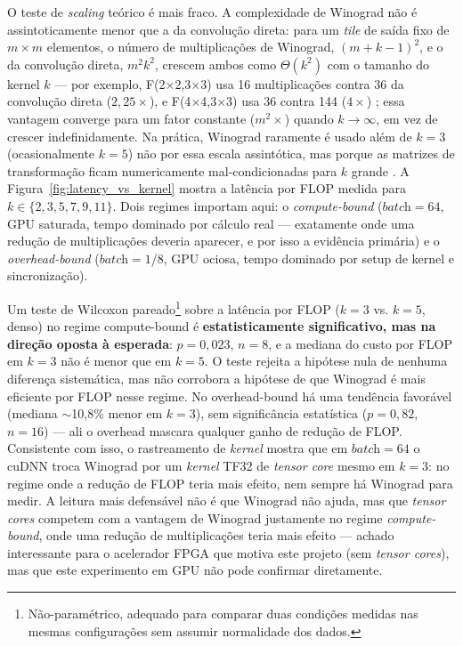\documentclass[conference]{IEEEtran}
\begin{document}
O teste de \textit{scaling} teórico é mais fraco. A complexidade de Winograd não é
assintoticamente menor que a da convolução direta: para um \textit{tile} de saída fixo de $m\times
m$ elementos, o número de multiplicações de Winograd, $(m+k-1)^2$, e o da convolução direta,
$m^2k^2$, crescem ambos como $\Theta(k^2)$ com o tamanho do kernel $k$ \cite{lavin2016fast} — por
exemplo, F(2$\times$2,3$\times$3) usa 16 multiplicações contra 36 da convolução direta
($2,25\times$), e F(4$\times$4,3$\times$3) usa 36 contra 144 ($4\times$) \cite{lavin2016fast}; essa
vantagem converge para um fator constante ($m^2\times$) quando $k\to\infty$, em vez de crescer
indefinidamente. Na prática, Winograd raramente é usado além de $k=3$ (ocasionalmente $k=5$) não
por essa escala assintótica, mas porque as matrizes de transformação ficam numericamente
mal-condicionadas para $k$ grande \cite{barabasz2020error}. A Figura~\ref{fig:latency_vs_kernel}
mostra a latência por FLOP medida para $k \in \{2,3,5,7,9,11\}$. Dois regimes importam aqui: o
\emph{compute-bound} ($\textit{batch}=64$, GPU saturada, tempo dominado por cálculo real —
exatamente onde uma redução de multiplicações deveria aparecer, e por isso a evidência primária) e o
\textit{overhead-bound} ($\textit{batch}=1$/$8$, GPU ociosa, tempo dominado por setup de kernel e
sincronização).

Um teste de Wilcoxon pareado\footnote{Não-paramétrico, adequado para comparar duas condições
medidas nas mesmas configurações sem assumir normalidade dos dados.} \cite{wilcoxon1945individual}
sobre a latência por FLOP ($k{=}3$ vs. $k{=}5$, denso) no regime compute-bound é
\textbf{estatisticamente significativo, mas na direção oposta à esperada}: $p=0,023$, $n=8$, e a
mediana do custo por FLOP em $k{=}3$ não é menor que em $k{=}5$. O teste rejeita a hipótese nula de
nenhuma diferença sistemática, mas não corrobora a hipótese de que Winograd é mais eficiente por
FLOP nesse regime. No overhead-bound há uma tendência favorável (mediana $\sim$10,8\% menor em
$k{=}3$), sem significância estatística ($p=0,82$, $n=16$) — ali o overhead mascara qualquer ganho
de redução de FLOP. Consistente com isso, o rastreamento de \textit{kernel} mostra que em
$\textit{batch}=64$ o cuDNN troca Winograd por um \textit{kernel} TF32 de \textit{tensor core}
mesmo em $k{=}3$: no regime onde a redução de FLOP teria mais efeito, nem sempre há Winograd para
medir. A leitura mais defensável
não é que Winograd não ajuda, mas que \textit{tensor cores} competem com a vantagem de Winograd
justamente no regime \textit{compute-bound}, onde uma redução de multiplicações teria mais efeito
— achado interessante para o acelerador FPGA que motiva este projeto (sem \textit{tensor cores}),
mas que este experimento em GPU não pode confirmar diretamente.
\end{document}
